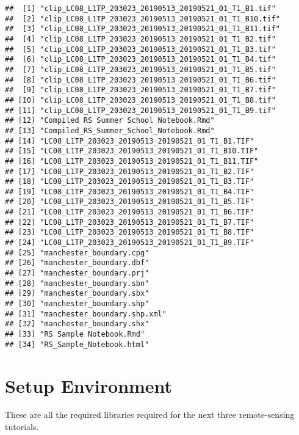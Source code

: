 \documentclass[]{article}
\begin{document}
\begin{verbatim}
##  [1] "clip_LC08_L1TP_203023_20190513_20190521_01_T1_B1.tif" 
##  [2] "clip_LC08_L1TP_203023_20190513_20190521_01_T1_B10.tif"
##  [3] "clip_LC08_L1TP_203023_20190513_20190521_01_T1_B11.tif"
##  [4] "clip_LC08_L1TP_203023_20190513_20190521_01_T1_B2.tif" 
##  [5] "clip_LC08_L1TP_203023_20190513_20190521_01_T1_B3.tif" 
##  [6] "clip_LC08_L1TP_203023_20190513_20190521_01_T1_B4.tif" 
##  [7] "clip_LC08_L1TP_203023_20190513_20190521_01_T1_B5.tif" 
##  [8] "clip_LC08_L1TP_203023_20190513_20190521_01_T1_B6.tif" 
##  [9] "clip_LC08_L1TP_203023_20190513_20190521_01_T1_B7.tif" 
## [10] "clip_LC08_L1TP_203023_20190513_20190521_01_T1_B8.tif" 
## [11] "clip_LC08_L1TP_203023_20190513_20190521_01_T1_B9.tif" 
## [12] "Compiled RS Summer School Notebook.Rmd"               
## [13] "Compiled_RS_Summer_School_Notebook.Rmd"               
## [14] "LC08_L1TP_203023_20190513_20190521_01_T1_B1.TIF"      
## [15] "LC08_L1TP_203023_20190513_20190521_01_T1_B10.TIF"     
## [16] "LC08_L1TP_203023_20190513_20190521_01_T1_B11.TIF"     
## [17] "LC08_L1TP_203023_20190513_20190521_01_T1_B2.TIF"      
## [18] "LC08_L1TP_203023_20190513_20190521_01_T1_B3.TIF"      
## [19] "LC08_L1TP_203023_20190513_20190521_01_T1_B4.TIF"      
## [20] "LC08_L1TP_203023_20190513_20190521_01_T1_B5.TIF"      
## [21] "LC08_L1TP_203023_20190513_20190521_01_T1_B6.TIF"      
## [22] "LC08_L1TP_203023_20190513_20190521_01_T1_B7.TIF"      
## [23] "LC08_L1TP_203023_20190513_20190521_01_T1_B8.TIF"      
## [24] "LC08_L1TP_203023_20190513_20190521_01_T1_B9.TIF"      
## [25] "manchester_boundary.cpg"                              
## [26] "manchester_boundary.dbf"                              
## [27] "manchester_boundary.prj"                              
## [28] "manchester_boundary.sbn"                              
## [29] "manchester_boundary.sbx"                              
## [30] "manchester_boundary.shp"                              
## [31] "manchester_boundary.shp.xml"                          
## [32] "manchester_boundary.shx"                              
## [33] "RS Sample Notebook.Rmd"                               
## [34] "RS_Sample_Notebook.html"
\end{verbatim}

\hypertarget{setup-environment}{%
\section{Setup Environment}\label{setup-environment}}

These are all the required libraries required for the next three
remote-sensing tutorials.
\end{document}

